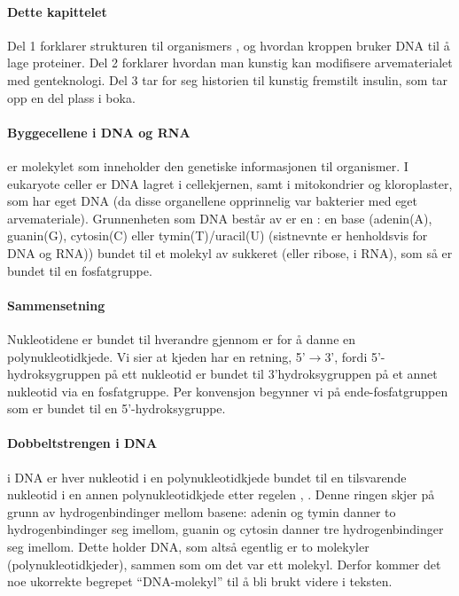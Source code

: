 
\paragraph{Dette kapittelet} Del 1 forklarer strukturen til organismers , og hvordan kroppen bruker DNA til å lage proteiner. Del 2 forklarer hvordan man kunstig kan modifisere arvematerialet med genteknologi. Del 3 tar for seg historien til kunstig fremstilt insulin, som tar opp en del plass i boka.


\paragraph{Byggecellene i DNA og RNA}  er molekylet som inneholder den genetiske informasjonen til organismer. I eukaryote celler er DNA lagret i cellekjernen, samt i mitokondrier og kloroplaster, som har eget DNA (da disse organellene opprinnelig var bakterier med eget arvemateriale). Grunnenheten som DNA består av er en : en base (adenin(A), guanin(G), cytosin(C) eller tymin(T)/uracil(U) (sistnevnte er henholdsvis for DNA og RNA)) bundet til et molekyl av sukkeret  (eller ribose, i RNA), som så er bundet til en fosfatgruppe. 

\paragraph{Sammensetning} Nukleotidene er bundet til hverandre gjennom er for å danne en polynukleotidkjede. Vi sier at kjeden har en retning, 5'$\rightarrow$3', fordi 5'-hydroksygruppen på ett nukleotid er bundet til 3'hydroksygruppen på et annet nukleotid via en fosfatgruppe. Per konvensjon begynner vi på ende-fosfatgruppen som er bundet til en 5'-hydroksygruppe.

\paragraph{Dobbeltstrengen i DNA} i DNA er hver nukleotid i en polynukleotidkjede bundet til en tilsvarende nukleotid i en annen polynukleotidkjede etter regelen , . Denne ringen skjer på grunn av hydrogenbindinger mellom basene: adenin og tymin danner to hydrogenbindinger seg imellom, guanin og cytosin danner tre hydrogenbindinger seg imellom. Dette holder DNA, som altså egentlig er to molekyler (polynukleotidkjeder), sammen som om det var ett molekyl. Derfor kommer det noe ukorrekte begrepet ``DNA-molekyl'' til å bli brukt videre i teksten.

